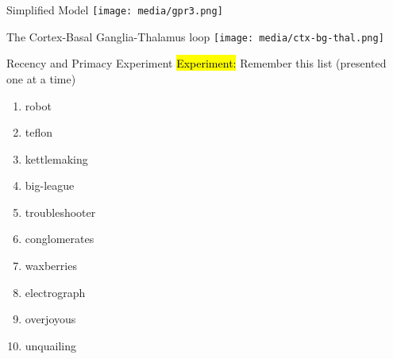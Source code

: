\documentclass[handout,aspectratio=169]{beamer}
\begin{document}
	\begin{frame}{Simplified Model}
		\centering
		\texttt{[image: media/gpr3.png]}
	\end{frame}

	\begin{frame}{The Cortex-Basal Ganglia-Thalamus loop}
		\centering
		\texttt{[image: media/ctx-bg-thal.png]}
	\end{frame}


  \begin{frame}{Recency and Primacy Experiment}
		\centering
		\Large
		\hl{Experiment:} Remember this list (presented one at a time)
		\begin{multicols}{2}
		\begin{enumerate}
			\centering
			\setlength{\itemsep}{0.25cm}
			\item robot
			\item teflon
			\item kettlemaking
			\item big-league
			\item troubleshooter
			\item conglomerates
			\item waxberries
			\item electrograph
			\item overjoyous
			\item unquailing
		\end{enumerate}
		\end{multicols}
	\end{frame}
\end{document}
